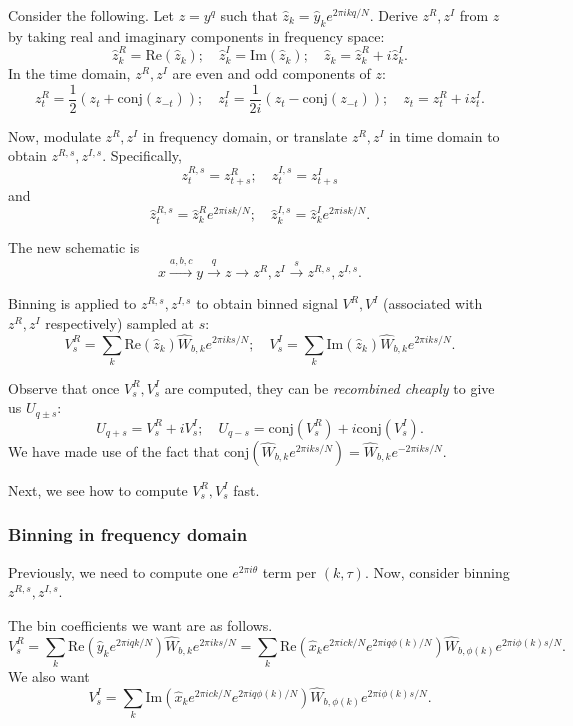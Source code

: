 \documentclass[10pt]{article}
\begin{document}
Consider the following. Let $z=y^q$ such that $\hat{z}_k = \hat{y}_k e^{2\pi i k q/N}$. Derive $z^R, z^I$ from $z$ by taking real and imaginary components in frequency space:
$$\hat{z}^R_k=\text{Re}(\hat{z}_k); \quad \hat{z}^I_k = \text{Im}(\hat{z}_k); \quad \hat{z}_k = \hat{z}_k^R + i \hat{z}_k^I.$$
In the time domain, $z^R,z^I$ are even and odd components of $z$:
$$z^R_t = \frac{1}{2}(z_t + \text{conj}(z_{-t})); \quad z^I_t = \frac{1}{2i}(z_t - \text{conj}(z_{-t})); \quad z_t = z_t^R + i z_t^I.$$

Now, modulate $z^R, z^I$ in frequency domain, or translate $z^R,z^I$ in time domain to obtain $z^{R,s}, z^{I,s}$. Specifically,
$$z^{R,s}_{t}=z^R_{t+s}; \quad z^{I,s}_{t}=z^I_{t+s}$$
and
$$\hat{z}^{R,s}_{t}=\hat{z}^R_{k}e^{2\pi i s k/N}; \quad \hat{z}^{I,s}_{k}=\hat{z}^I_{k} e^{2\pi i sk/N}.$$

The new schematic is
$$x \xrightarrow{a,b,c}{y} \xrightarrow{q} z \rightarrow z^R, z^I \xrightarrow{s} z^{R,s}, z^{I,s}.$$

Binning is applied to $z^{R,s}, z^{I,s}$ to obtain binned signal $V^R, V^I$ (associated with $z^R, z^I$ respectively) sampled at $s$:
$$V^{R}_s = \sum_k \text{Re}(\hat{z}_k) \hat{W}_{b,k} e^{2\pi i ks/N};\quad V^{I}_s = \sum_k \text{Im}(\hat{z}_k) \hat{W}_{b,k} e^{2\pi i ks/N}.$$

Observe that once $V^R_s,V^I_s$ are computed, they can be \emph{recombined cheaply} to give us $U_{q\pm s}$:
$$U_{q+s} = V^{R}_s + i V^I_s; \quad U_{q-s} = \text{conj}(V^{R}_s) + i \text{conj}(V^{I}_s).$$
We have made use of the fact that $\text{conj}(\hat{W}_{b,k} e^{2\pi i ks/N}) = \hat{W}_{b,k} e^{-2\pi i ks/N}$.

Next, we see how to compute $V^R_s, V^I_{s}$ fast.

\subsubsection{Binning in frequency domain}

Previously, we need to compute one $e^{2\pi i \theta}$ term per $(k, \tau)$. Now, consider binning $z^{R,s},z^{I,s}$.

The bin coefficients we want are as follows.
$$V^R_s = \sum_k \text{Re}(\hat{y}_k e^{2\pi i qk/N}) \hat{W}_{b,k} e^{2\pi i k s/N} = \sum_k \text{Re}(\hat{x}_k e^{2\pi i ck/N} e^{2\pi i q \phi(k)/N})\hat{W}_{b,\phi(k)} e^{2\pi i \phi(k) s/N}.$$
We also want
$$V^I_s = \sum_k \text{Im}(\hat{x}_k e^{2\pi i ck/N} e^{2\pi i q \phi(k)/N})\hat{W}_{b,\phi(k)} e^{2\pi i \phi(k) s/N}.$$
\end{document}
